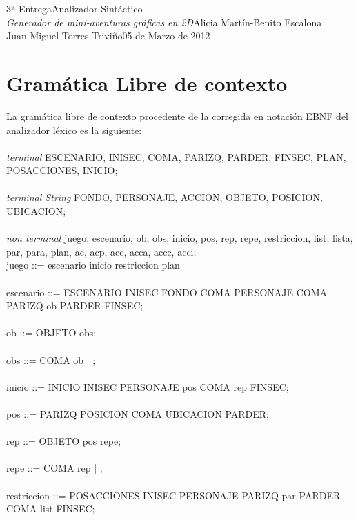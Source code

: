 \documentclass[11pt,a4paper,spanish,twoside]{book}
\theoremstyle{plain} \newtheorem{nota}{Nota}
\begin{document}
{3ª Entrega}{Analizador Sintáctico\\\emph{Generador de mini-aventuras 
gráficas en 2D}}{Alicia Martín-Benito Escalona\\Juan Miguel Torres Triviño}{05 
de Marzo de 2012}  


\tableofcontents
\chapter{Gramática Libre de contexto}
La gramática libre de contexto procedente de la corregida en notación
EBNF del analizador léxico es la siguiente:
\\ 
\\
\emph{terminal} ESCENARIO, INISEC, COMA, PARIZQ, PARDER, FINSEC, PLAN, POSACCIONES, INICIO;
\\
\\
\emph{terminal String} FONDO, PERSONAJE, ACCION, OBJETO, POSICION, UBICACION;
\\
\\
\emph{non terminal} juego, escenario, ob, obs, inicio, pos, rep, repe, restriccion, list, lista, par, para, plan, ac, acp, acc, acca, acce, acci;
\\
juego ::= escenario inicio restriccion plan
\\
\\
escenario ::= ESCENARIO INISEC FONDO COMA PERSONAJE COMA PARIZQ ob PARDER FINSEC; 
\\
\\
ob ::= OBJETO obs;
\\
\\
obs ::= COMA ob | ;
\\
\\
inicio ::= INICIO INISEC PERSONAJE pos COMA rep FINSEC;
\\
\\
pos ::= PARIZQ POSICION COMA UBICACION PARDER;
\\
\\
rep ::= OBJETO pos repe;
\\
\\
repe ::= COMA rep | ;
\\
\\
restriccion ::= POSACCIONES INISEC PERSONAJE PARIZQ par PARDER COMA list FINSEC;
\\
\\
\end{document}

